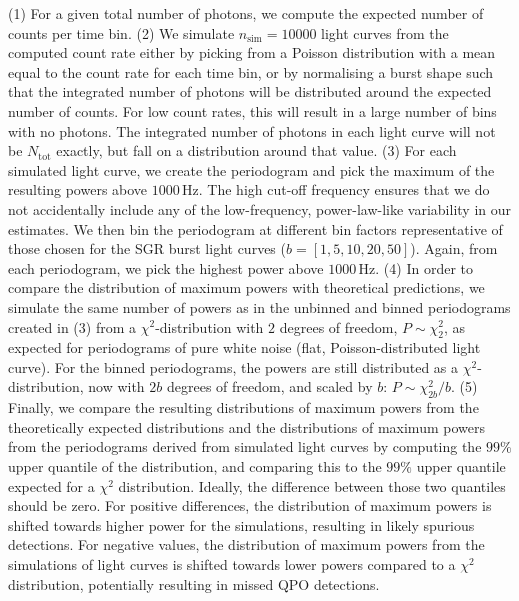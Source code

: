 \documentclass[numberedappendix]{emulateapj}
\newcommand{\hz}{\,\mathrm{Hz}}
\begin{document}
(1) For a given total number of photons, we compute the expected number of counts per time bin. 
(2) We simulate $n_{\mathrm{sim}} = 10000$ light curves from the computed count rate either by picking from a Poisson distribution with a mean equal to the count rate for each time bin, or by normalising a burst shape such that the integrated number of photons will be distributed around the expected number of counts. For low count rates, this will result in a large number of bins with no photons. The integrated number of photons in each light curve will not be $N_{\mathrm{tot}}$ exactly, but fall on a distribution around that value.
(3) For each simulated light curve, we create the periodogram and pick the maximum of the resulting powers above $1000 \hz$. The high cut-off frequency ensures that we do not accidentally include any of the low-frequency, power-law-like variability in our estimates. We then bin the periodogram at different bin factors representative of those chosen for the SGR burst light curves ($b = [1, 5, 10, 20, 50]$). Again, from each periodogram, we pick the highest power above $1000 \hz$.
(4) In order to compare the distribution of maximum powers with theoretical predictions, we simulate the same number of powers as in the unbinned and binned periodograms created in (3) from a $\chi^2$-distribution with $2$ degrees of freedom, $P \sim \chi^2_2$, as expected for periodograms of pure white noise (flat, Poisson-distributed light curve). For the binned periodograms, the powers are still distributed as a $\chi^2$-distribution, now with $2b$ degrees of freedom, and scaled by $b$: $P \sim \chi^2_{2b}/b$.
(5) Finally, we compare the resulting distributions of maximum powers from the theoretically expected distributions and the distributions of maximum powers from the periodograms derived from simulated light curves by computing the $99\%$ upper quantile of the distribution, and comparing this to the $99\%$ upper quantile expected for a $\chi^2$ distribution. Ideally, the difference between those two quantiles should be zero. For positive differences, the distribution of maximum powers is shifted towards higher power for the simulations, resulting in likely spurious detections. For negative values, the distribution of maximum powers from the simulations of light curves is shifted towards lower powers compared to a $\chi^2$ distribution, potentially resulting in missed QPO detections.
\end{document}
